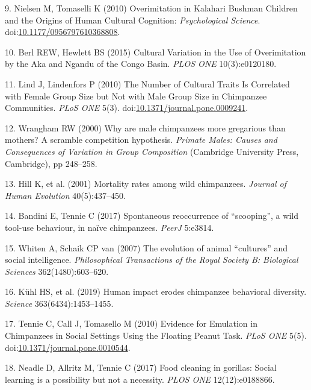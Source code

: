 \documentclass[9pt,twocolumn,twoside,]{pnas-new}
\begin{document}
\leavevmode\hypertarget{ref-nielsen_overimitation_2010}{}%
9. Nielsen M, Tomaselli K (2010) Overimitation in Kalahari Bushman
Children and the Origins of Human Cultural Cognition:
\emph{Psychological Science}.
doi:\href{https://doi.org/10.1177/0956797610368808}{10.1177/0956797610368808}.

\leavevmode\hypertarget{ref-berl_cultural_2015}{}%
10. Berl REW, Hewlett BS (2015) Cultural Variation in the Use of
Overimitation by the Aka and Ngandu of the Congo Basin. \emph{PLOS ONE}
10(3):e0120180.

\leavevmode\hypertarget{ref-lind_number_2010}{}%
11. Lind J, Lindenfors P (2010) The Number of Cultural Traits Is
Correlated with Female Group Size but Not with Male Group Size in
Chimpanzee Communities. \emph{PLoS ONE} 5(3).
doi:\href{https://doi.org/10.1371/journal.pone.0009241}{10.1371/journal.pone.0009241}.

\leavevmode\hypertarget{ref-wrangham_why_2000}{}%
12. Wrangham RW (2000) Why are male chimpanzees more gregarious than
mothers? A scramble competition hypothesis. \emph{Primate Males: Causes
and Consequences of Variation in Group Composition} (Cambridge
University Press, Cambridge), pp 248--258.

\leavevmode\hypertarget{ref-hill_mortality_2001}{}%
13. Hill K, et al. (2001) Mortality rates among wild chimpanzees.
\emph{Journal of Human Evolution} 40(5):437--450.

\leavevmode\hypertarget{ref-bandini_spontaneous_2017}{}%
14. Bandini E, Tennie C (2017) Spontaneous reoccurrence of ``scooping'',
a wild tool-use behaviour, in naïve chimpanzees. \emph{PeerJ} 5:e3814.

\leavevmode\hypertarget{ref-whiten_evolution_2007}{}%
15. Whiten A, Schaik CP van (2007) The evolution of animal ``cultures''
and social intelligence. \emph{Philosophical Transactions of the Royal
Society B: Biological Sciences} 362(1480):603--620.

\leavevmode\hypertarget{ref-kuhl_human_2019}{}%
16. Kühl HS, et al. (2019) Human impact erodes chimpanzee behavioral
diversity. \emph{Science} 363(6434):1453--1455.

\leavevmode\hypertarget{ref-tennie_evidence_2010}{}%
17. Tennie C, Call J, Tomasello M (2010) Evidence for Emulation in
Chimpanzees in Social Settings Using the Floating Peanut Task.
\emph{PLoS ONE} 5(5).
doi:\href{https://doi.org/10.1371/journal.pone.0010544}{10.1371/journal.pone.0010544}.

\leavevmode\hypertarget{ref-neadle_food_2017}{}%
18. Neadle D, Allritz M, Tennie C (2017) Food cleaning in gorillas:
Social learning is a possibility but not a necessity. \emph{PLOS ONE}
12(12):e0188866.
\end{document}
